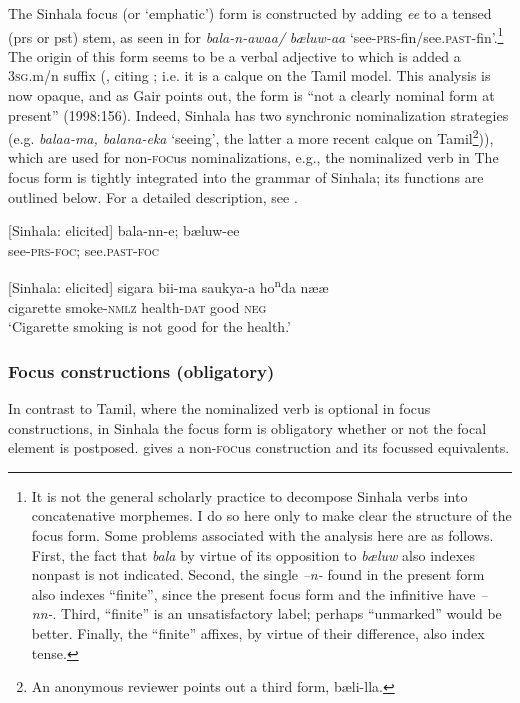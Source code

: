 The Sinhala focus (or `emphatic') form is constructed by adding \textit{ee} to a tensed (prs or pst) stem, as seen in  for \textit{bala-n-awaa/} \textit{b{\ae}luw-aa }`see-\textsc{prs}-fin/see.\textsc{past}-fin'.\footnote{It is not the general scholarly practice to decompose Sinhala verbs into concatenative morphemes. I do so here only to make clear the structure of the focus form. Some problems associated with the analysis here are as follows. First, the fact that \textit{bala} by virtue of its opposition to \textit{b{\ae}luw} also indexes nonpast is not indicated. Second, the single \textit{--}\textit{n- }found in the present form also indexes ``finite'', since the present focus form and the infinitive have \textit{--}\textit{nn-}. Third, ``finite'' is an unsatisfactory label; perhaps ``unmarked'' would be better. Finally, the ``finite'' affixes, by virtue of their difference, also index tense.
}
The origin of this form seems to be a verbal adjective to which is added a 3\textsc{sg}.m/n suffix (\citet[156]{Gair1986}, citing \citet[134-5]{Geiger1938}; i.e. it is a calque on the Tamil model. This analysis is now opaque, and as Gair points out, the form is ``not a clearly nominal form at present'' (1998:156). 
Indeed, Sinhala has two synchronic nominalization strategies (e.g.\textit{ balaa-ma, balana-eka} `seeing', the latter a more recent calque on Tamil\footnote{An anonymous reviewer points out a third form, b{\ae}li-lla.})), which are used for non-\textsc{foc}us nominalizations, e.g., the nominalized verb in  The focus form is tightly integrated into the grammar of Sinhala; its functions are outlined below. For a detailed description, see \citet{Gair1986}.

\ea\label{smith:ex:21}
{}[Sinhala: elicited]
\gll bala-nn-e; b{\ae}luw-ee\\
see-\textsc{prs}-\textsc{foc}; see.\textsc{past}-\textsc{foc}\\
\z

\ea\label{smith:ex:22}
{}[Sinhala: elicited]
\gll sigara{\textrtailt} bii-ma saukya-{\textrtailt}a ho\textsuperscript{n}da n{\ae}{\ae}\\
cigarette smoke-\textsc{nmlz} health-\textsc{dat} good \textsc{neg}\\
`Cigarette smoking is not good for the health.'
\z


\subsubsection{Focus constructions (obligatory)}%
In contrast to Tamil, where the nominalized verb is optional in focus constructions, in Sinhala the focus form is obligatory whether or not the focal element is postposed.  gives a non-\textsc{foc}us construction and  its focussed equivalents. 


